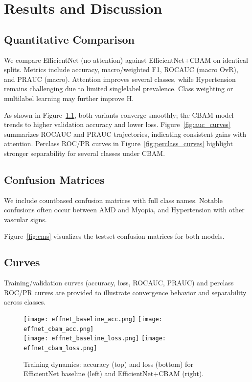 \chapter{Results and Discussion}\label{sec:results}
\section{Quantitative Comparison}
We compare EfficientNet (no attention) against EfficientNet+CBAM on identical splits. Metrics include accuracy, macro/weighted F1, ROC\textendash AUC (macro OvR), and PR\textendash AUC (macro). Attention improves several classes, while Hypertension remains challenging due to limited single\textendash label prevalence. Class weighting or multi\textendash label learning may further improve H.

As shown in Figure~\ref{fig:train_curves}, both variants converge smoothly; the CBAM model trends to higher validation accuracy and lower loss. Figure~\ref{fig:auc_curves} summarizes ROC\textendash AUC and PR\textendash AUC trajectories, indicating consistent gains with attention. Per\textendash class ROC/PR curves in Figure~\ref{fig:perclass_curves} highlight stronger separability for several classes under CBAM.

\section{Confusion Matrices}
We include count\textendash based confusion matrices with full class names. Notable confusions often occur between AMD and Myopia, and Hypertension with other vascular signs.

Figure~\ref{fig:cms} visualizes the test\textendash set confusion matrices for both models.

\section{Curves}\label{sec:results_figs}
Training/validation curves (accuracy, loss, ROC\textendash AUC, PR\textendash AUC) and per\textendash class ROC/PR curves are provided to illustrate convergence behavior and separability across classes.

\begin{figure}[t]
  \centering
  \texttt{[image: effnet\_baseline\_acc.png]}
  \texttt{[image: effnet\_cbam\_acc.png]}\\
  \texttt{[image: effnet\_baseline\_loss.png]}
  \texttt{[image: effnet\_cbam\_loss.png]}
  \caption{Training dynamics: accuracy (top) and loss (bottom) for EfficientNet baseline (left) and EfficientNet+CBAM (right).}
  \label{fig:train_curves}
\end{figure}

